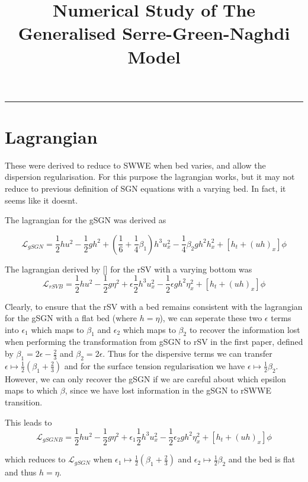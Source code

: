 \documentclass[10pt]{elsarticle}
\title{Numerical Study of The Generalised Serre-Green-Naghdi Model}
\begin{document}
\maketitle

\vspace{-0.3in}
\noindent
\rule{\linewidth}{0.4pt}

\section{Lagrangian}
These were derived to reduce to SWWE when bed varies, and allow the dispersion regularisation. For this purpose the lagrangian works, but it may not reduce to previous definition of SGN equations with a varying bed. In fact, it seems like it doesnt. 


The lagrangian for the gSGN was derived  as

\[\mathcal{L}_{gSGN} = \frac{1}{2}hu^2 - \frac{1}{2} g h^2 + \left(\frac{1}{6} + \frac{1}{4}\beta_1\right)h^3 u_x^2 - \frac{1}{4} \beta_2 g h^2  h_x^2 + \left[h_t + \left(uh\right)_x\right]\phi \]

The lagrangian derived by [] for the rSV with a varying bottom was
\[\mathcal{L}_{rSVB} = \frac{1}{2}hu^2 - \frac{1}{2} g \eta^2 + \epsilon \frac{1}{2} h^3 u_x^2  - \frac{1}{2} \epsilon g h^2  \eta_x^2 + \left[h_t + \left(uh\right)_x\right]\phi \]

Clearly, to ensure that the rSV with a bed remains consistent with the lagrangian for the gSGN with a flat bed (where $h = \eta$), we can seperate these two $\epsilon$ terms into $\epsilon_1$ which maps to $\beta_1$ and $\epsilon_2$ which maps to $\beta_2$ to recover the information lost when performing the transformation from gSGN to rSV in the first paper, defined by $\beta_1 = 2 \epsilon - \frac{2}{3}$ and $\beta_2 = 2 \epsilon$. Thus for the dispersive terms we can transfer $\epsilon \mapsto \frac{1}{2} \left(\beta_1 + \frac{2}{3} \right)$ and for the surface tension regularisation we have  $\epsilon \mapsto \frac{1}{2} \beta_2$. However, we can only recover the gSGN if we are careful about which epsilon maps to which $\beta$, since we have lost information in the gSGN to rSWWE transition.

This leads to 
\[\mathcal{L}_{gSGNB} = \frac{1}{2}hu^2 - \frac{1}{2} g \eta^2 + \epsilon_1 \frac{1}{2} h^3 u_x^2  - \frac{1}{2} \epsilon_2 g h^2  \eta_x^2 + \left[h_t + \left(uh\right)_x\right]\phi \]

which reduces to $\mathcal{L}_{gSGN}$ when $\epsilon_1 \mapsto \frac{1}{2} \left(\beta_1 + \frac{2}{3} \right)$ and $\epsilon_2 \mapsto \frac{1}{2} \beta_2$ and the bed is flat and thus $h = \eta$.
\end{document}
